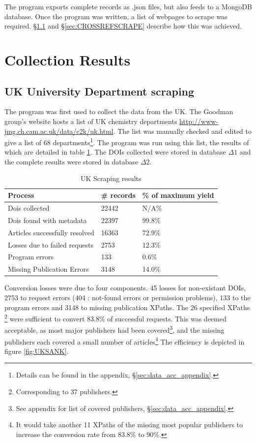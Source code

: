 The program exports complete records as .json files, but also feeds to a MongoDB database. Once the program was written, a list of webpages to scrape was required. \S\ref{sec:UKSCRAPE} and \S\ref{sec:CROSSREFSCRAPE} describe how this was achieved.
\section{Collection Results}
\subsection{UK University Department scraping}
\label{sec:UKSCRAPE}
The program was first used to collect the data from the UK. The Goodman group's website hosts a list of UK chemistry departments \url{http://www-jmg.ch.cam.ac.uk/data/c2k/uk.html}. The list was manually checked and edited to give a list of 68 departments\footnote{Details can be found in the appendix, \S\ref{sec:data_acc_appendix}.}. The program was run using this list, the results of which are detailed in table \ref{tab:UKSCRAPERES}. The DOIs collected were stored in database $\Delta1$ and the complete results were stored in database $\Delta2$.
\begin{table}[H]
\caption{UK Scraping results}
\label{tab:UKSCRAPERES}
\begin{center}
\begin{tabular}{||l|l|l||}
\hline
Process & \# records & \% of maximum yield\\
\hline
Dois collected & 22442 & N/A\%\\
Dois found with metadata & 22397 & 99.8\%\\
Articles successfully resolved & 16363 & 72.9\%\\
Losses due to failed requests & 2753 & 12.3\%\\
Program errors & 133 & 0.6\%\\
Missing Publication Errors & 3148 & 14.0\% \\
\hline
\end{tabular}
\end{center}
\end{table}
Conversion losses were due to four components. 45 losses for non-existant DOIs, 2753 to request errors (404 : not-found errors or permission problems), 133 to the program errors and 3148 to missing publication XPaths. The 26 specified XPaths \footnote{Corresponding to 37 publishers.} were sufficient to convert 83.8\% of successful requests. This was deemed acceptable, as most major publishers had been covered\footnote{See appendix for list of covered publishers, \S\ref{sec:data_acc_appendix}.}, and the missing publishers each covered a small number of articles\footnote{It would take another 11 XPaths of the missing most popular publishers to increase the conversion rate from 83.8\% to 90\%.}
The efficiency is depicted in figure \ref{fig:UKSANK}.


